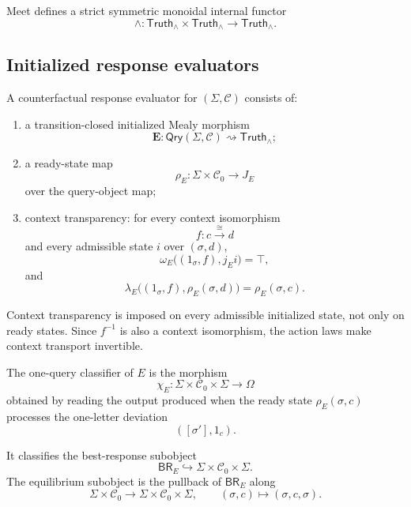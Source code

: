 Meet defines a strict symmetric monoidal internal functor
\[
  \wedge:
  \mathsf{Truth}_\wedge\times\mathsf{Truth}_\wedge
  \longrightarrow
  \mathsf{Truth}_\wedge.
\]

\subsection{Initialized response evaluators}

\begin{definition}
\label{def:counterfactual-response-evaluator}
A counterfactual response evaluator for \((\Sigma,\mathcal C)\) consists of:
\begin{enumerate}
  \item a transition-closed initialized Mealy morphism
  \[
    \mathbf E:
    \mathsf{Qry}(\Sigma,\mathcal C)
    \rightsquigarrow
    \mathsf{Truth}_\wedge;
  \]
  \item a ready-state map
  \[
    \rho_E:
    \Sigma\times\mathcal C_0
    \longrightarrow
    J_E
  \]
  over the query-object map;
  \item context transparency: for every context isomorphism
  \[
    f:c\overset{\cong}{\longrightarrow}d
  \]
  and every admissible state \(i\) over \((\sigma,d)\),
  \[
    \omega_E
    \bigl(
      (1_\sigma,f),
      j_Ei
    \bigr)
    =
    \top,
  \]
  and
  \[
    \lambda_E
    \bigl(
      (1_\sigma,f),
      \rho_E(\sigma,d)
    \bigr)
    =
    \rho_E(\sigma,c).
  \]
\end{enumerate}
\end{definition}

Context transparency is imposed on every admissible initialized state, not only on ready states.
Since \(f^{-1}\) is also a context isomorphism, the action laws make context transport invertible.

\begin{definition}
\label{def:one-query-classifier}
The one-query classifier of \(E\) is the morphism
\[
  \chi_E:
  \Sigma\times\mathcal C_0\times\Sigma
  \longrightarrow
  \Omega
\]
obtained by reading the output produced when the ready state
\(\rho_E(\sigma,c)\) processes the one-letter deviation
\[
  ([\sigma'],1_c).
\]

It classifies the best-response subobject
\[
  \mathsf{BR}_E
  \hookrightarrow
  \Sigma\times\mathcal C_0\times\Sigma.
\]
The equilibrium subobject is the pullback of \(\mathsf{BR}_E\) along
\[
  \Sigma\times\mathcal C_0
  \longrightarrow
  \Sigma\times\mathcal C_0\times\Sigma,
  \qquad
  (\sigma,c)\longmapsto(\sigma,c,\sigma).
\]
\end{definition}

